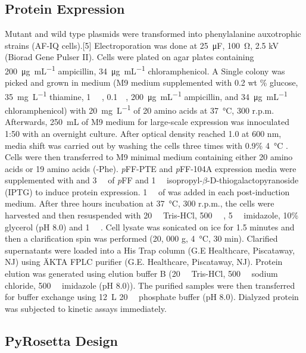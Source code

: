 \begin{refsection}
\subsection{Protein Expression}
\label{sec:protein-expression-method}

Mutant and wild type plasmids were transformed into  phenylalanine
auxotrophic strains (AF-IQ cells).[5] Electroporation was done at
\SI{25}{\micro\farad}, \SI{100}{\ohm}, 2.5 kV (Biorad Gene Pulser II). Cells were
plated on agar plates containing \SI{200}{\ug\per\mL} ampicillin, \SI{34}{\ug\per\mL}
chloramphenicol. A Single colony was picked and grown in medium (M9 medium
supplemented with 0.2 wt \% glucose, \SI{35}{\mg\per\L} thiamine, \SI{1}{\milli\Molar}
, \SI{0.1}{\milli\Molar}, \SI{200}{\ug\per\mL} ampicillin, and
\SI{34}{\ug\per\mL} chloramphenicol) with \SI{20}{\mg\per\L} of 20 amino acids
at \SI{37}{\celsius}, 300 r.p.m.  Afterwards, \SI{250}{\mL} of M9 medium for
large-scale expression was innoculated 1:50 with an overnight culture.  After
optical density reached 1.0 at 600 nm, media shift was carried out by washing
the cells three times with 0.9\% \SI{4}{\celsius} .  Cells were then
transferred to M9 minimal medium containing either 20 amino acids or 19 amino
acids (-Phe). \emph{p}FF-PTE and \emph{p}FF-104A expression media were
supplemented with and \SI{3}{\milli\Molar} of \emph{p}FF and
\SI{1}{\milli\Molar} isopropyl-$\beta$-D-thiogalactopyranoside (IPTG) to induce
protein expression.  \SI{1}{\milli\Molar} of  was added in each
post-induction medium. After three hours incubation at \SI{37}{\celsius}, 300
r.p.m., the cells were harvested and then resuspended with
\SI{20}{\milli\Molar} Tris-HCl, \SI{500}{\milli\Molar} ,
\SI{5}{\milli\Molar} imidazole, 10\% glycerol (pH 8.0) and \SI{1}{\micro\Molar}
. Cell lysate was sonicated on ice for 1.5 minutes and then a
clarification spin was performed (20, 000 g, \SI{4}{\celsius}, 30 min).
Clarified supernatants were loaded into a His Trap column (G.E Healthcare,
Piscataway, NJ) using ÄKTA FPLC purifier (G.E.  Healthcare, Piscataway, NJ).
Protein elution was generated using elution buffer B (\SI{20}{\milli\Molar}
Tris-HCl, \SI{500}{\milli\Molar} sodium chloride, \SI{500}{\milli\Molar}
imidazole (pH 8.0)).  The purified samples were then transferred for buffer
exchange using \SI{12}{\L} \SI{20}{\milli\Molar} phosphate buffer (pH 8.0).
Dialyzed protein was subjected to kinetic assays immediately.

\subsection{PyRosetta Design}
\label{sec:rosetta-method}


\end{refsection}
